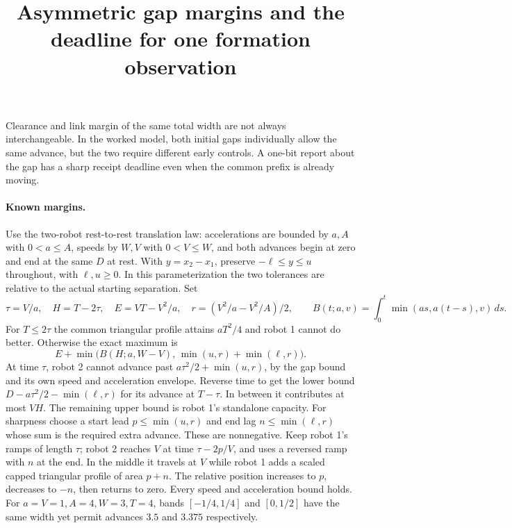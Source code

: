 \documentclass[11pt]{article}
\title{Asymmetric gap margins and the deadline for one formation observation}
\begin{document}
\maketitle

Clearance and link margin of the same total width are not always
interchangeable. In the worked model, both initial gaps individually
allow the same advance, but the two require different early controls.
A one-bit report about the gap has a sharp receipt deadline even
when the common prefix is already moving.

\paragraph{Known margins.}
Use the two-robot rest-to-rest translation law: accelerations are
bounded by \(a,A\) with \(0<a\le A\), speeds by \(W,V\) with
\(0<V\le W\), and both advances begin at zero and end at the same
\(D\) at rest. With \(y=x_2-x_1\), preserve
\(-\ell\le y\le u\) throughout, with \(\ell,u\ge0\). In this
parameterization the two tolerances are relative to the actual
starting separation. Set
\[
 \tau=V/a,\quad H=T-2\tau,\quad E=VT-V^2/a,\quad
 r=(V^2/a-V^2/A)/2,\qquad
 B(t;a,v)=\int_0^t\min(a s,a(t-s),v)\,ds .
\]
For \(T\le2\tau\) the common triangular profile attains \(aT^2/4\)
and robot 1 cannot do better. Otherwise the exact maximum is
\[
       E+\min\bigl(B(H;a,W-V),\,\min(u,r)+\min(\ell,r)\bigr).
\]
At time \(\tau\), robot 2 cannot advance past
\(a\tau^2/2+\min(u,r)\), by the gap bound and its own speed and
acceleration envelope. Reverse time to get the lower bound
\(D-a\tau^2/2-\min(\ell,r)\) for its advance at \(T-\tau\).
In between it contributes at most \(VH\). The remaining upper bound
is robot 1's standalone capacity.
For sharpness choose a start lead \(p\le\min(u,r)\) and end lag
\(n\le\min(\ell,r)\) whose sum is the required extra advance.
These are nonnegative. Keep robot 1's ramps of length \(\tau\);
robot 2 reaches \(V\) at time \(\tau-2p/V\), and uses a reversed
ramp with \(n\) at the end. In the middle it travels at \(V\)
while robot 1 adds a scaled capped triangular profile of area
\(p+n\). The relative position increases to \(p\), decreases
to \(-n\), then returns to zero. Every speed and acceleration
bound holds. For \(a=V=1,A=4,W=3,T=4\), bands
\([-1/4,1/4]\) and \([0,1/2]\) have the same width yet permit
advances \(3.5\) and \(3.375\) respectively.
\end{document}

